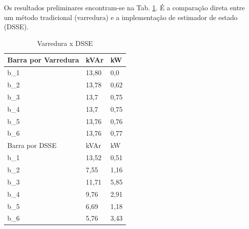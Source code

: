 \documentclass{IEEEtran}
\begin{document}
Os resultados preliminares encontram-se na Tab. \ref{tab_result}. É a comparação direta entre um método tradicional (varredura) e a implementação de estimador de estado (DSSE).
\begin{table}[position specifier]
  \centering
  \begin{tabular}{| l | l | l |}
  \hline
  Barra por Varredura & kVAr & kW\\
  \hline
  b\_1 & 13,80 & 0,0 \\
	b\_2 &  13,78 & 0,62 \\
	b\_3 & 13,7 & 0,75 \\
	b\_4 & 13,7 & 0,75 \\
	b\_5 & 13,76 & 0,76 \\
	b\_6 & 13,76 & 0,77 \\
	\hline
  Barra por DSSE & kVAr & kW\\
  \hline
  b\_1 & 13,52 & 0,51 \\
	b\_2 &  7,55 & 1,16 \\
	b\_3 & 11,71 & 5,85 \\
	b\_4 & 9,76 & 2,91 \\
	b\_5 & 6,69 & 1,18 \\
	b\_6 & 5,76 & 3,43 \\
  \hline
\end{tabular}
  \caption{Varredura x DSSE}
  \label{tab_result}
\end{table}
\end{document}
